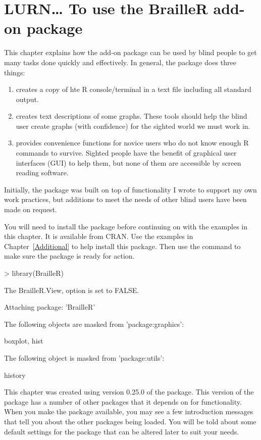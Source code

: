 \chapter{LURN\ldots{} To use the BrailleR add-on package}
\label{BrailleR}



This chapter explains how the  add-on package can be used by blind people to get many tasks done quickly and effectively. In general, the package does three things:\begin{enumerate}
\item creates a copy of hte R console/terminal in a text file including all standard output.
\item creates text descriptions of some graphs. These tools should help the blind user create graphs (with confidence) for the sighted world we must work in.
\item provides convenience functions for novice users who do not know enough R commands to survive. Sighted people have the benefit of graphical user interfaces (GUI) to help them, but none of them are accessible by screen reading software.
\end{enumerate}
Initially, the package was built on top of functionality I wrote to support my own work practices, but additions to meet the needs of other blind \R{} users have been made on request. 


You will need to install the  package before continuing on with the examples in this chapter. It is available from CRAN. Use the examples in Chapter~\ref{Additional} to help install this package. Then use the  command to make sure the package is ready for action.
\begin{Schunk}
\begin{Sinput}
> library(BrailleR)
\end{Sinput}
\begin{Soutput}
The BrailleR.View,  option is set to FALSE.
\end{Soutput}
\begin{Soutput}

Attaching package: 'BrailleR'
\end{Soutput}
\begin{Soutput}
The following objects are masked from 'package:graphics':

    boxplot, hist
\end{Soutput}
\begin{Soutput}
The following object is masked from 'package:utils':

    history
\end{Soutput}
\end{Schunk}
This chapter was created using version 0.25.0 of the  package. This version of the package has a number of other packages that it depends on for functionality. When you make the  package available, you may see a few introduction messages that tell you about the other packages being loaded. You will be told about some default settings for the package that can be altered later to suit your needs.


